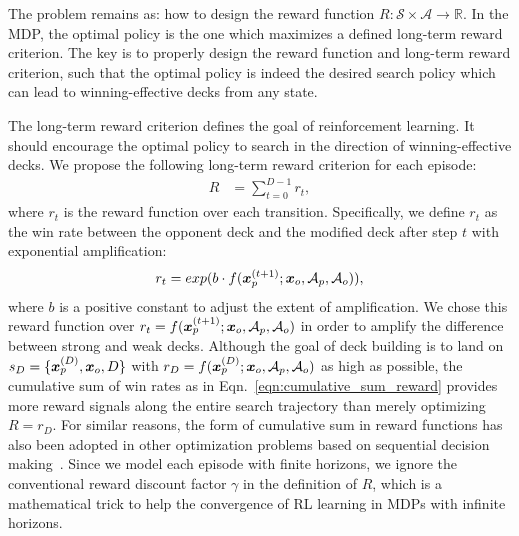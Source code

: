 

The problem remains as: how to design the reward function $R: \mathcal{S} \times \mathcal{A} \rightarrow \mathbb{R}$. In the MDP, the optimal policy is the one which maximizes a defined long-term reward criterion. The  key is to properly design the reward function and long-term reward criterion, such that the optimal policy is indeed the desired search policy which can lead to winning-effective decks from any state. 

The long-term reward criterion defines the goal of reinforcement learning. It should encourage the optimal policy to search in the direction of winning-effective decks. We propose the following long-term reward criterion for each episode:
\begin{align}
R &=\sum_{t=0}^{D-1} r_t,
\label{eqn:cumulative_sum_reward}
\end{align}
where $r_t$ is the reward function over each transition. Specifically, we define $r_t$ as the win rate between the opponent deck and the modified deck after step $t$ with exponential amplification:
\begin{align}
    r_t=exp(b \cdot f(\boldsymbol{x}^{(t+1)}_p; \boldsymbol{x}_o, \mathcal{A}_p, \mathcal{A}_o)),
\end{align}
where $b$ is a positive constant to adjust the extent of amplification. We chose this reward function over $r_t=f(\boldsymbol{x}^{(t+1)}_p; \boldsymbol{x}_o, \mathcal{A}_p, \mathcal{A}_o)$ in order to amplify the difference between strong and weak decks. Although the goal of deck building is to land on ${s_D=\{\boldsymbol{x}_p^{(D)}, \boldsymbol{x}_o, D\}}$ with $r_D=f(\boldsymbol{x}_p^{(D)}; \boldsymbol{x}_o, \mathcal{A}_p, \mathcal{A}_o)$ as high as possible, the cumulative sum of win rates as in Eqn.~\ref{eqn:cumulative_sum_reward} provides more reward signals along the entire search trajectory than merely optimizing ${R=r_D}$. For similar reasons, the form of cumulative sum in reward functions has also been adopted in other optimization problems based on sequential decision making~\citep{andrychowicz2016learning,chenlearning}. Since we model each episode with finite horizons, we ignore the conventional reward discount factor $\gamma$ in the definition of $R$, which is a mathematical trick to help the convergence of RL learning in MDPs with infinite horizons. 

